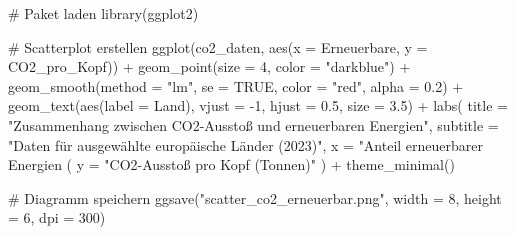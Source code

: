 # Paket laden
library(ggplot2)

# Scatterplot erstellen
ggplot(co2_daten, aes(x = Erneuerbare, y = CO2_pro_Kopf)) +
  geom_point(size = 4, color = "darkblue") +
  geom_smooth(method = "lm", se = TRUE, color = "red", alpha = 0.2) +
  geom_text(aes(label = Land), vjust = -1, hjust = 0.5, size = 3.5) +
  labs(
    title = "Zusammenhang zwischen CO2-Ausstoß und erneuerbaren Energien",
    subtitle = "Daten für ausgewählte europäische Länder (2023)",
    x = "Anteil erneuerbarer Energien (%
    y = "CO2-Ausstoß pro Kopf (Tonnen)"
  ) +
  theme_minimal()

# Diagramm speichern
ggsave("scatter_co2_erneuerbar.png", width = 8, height = 6, dpi = 300)